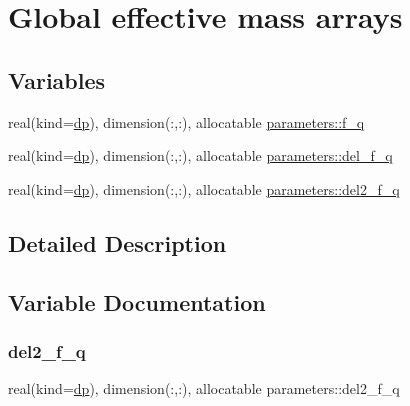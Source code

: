 \hypertarget{group__EFF__MASSES}{}\section{Global effective mass arrays}
\label{group__EFF__MASSES}
\subsection*{Variables}
\begin{DoxyCompactItemize}
\item 
real(kind=\mbox{\hyperlink{namespaceparameters_a52f8c6351fd79345d8811e065bcbbb37}{dp}}), dimension(\+:,\+:), allocatable \mbox{\hyperlink{group__EFF__MASSES_ga5d14e09efe44edd96be9317868828e75}{parameters\+::f\+\_\+q}}
\item 
real(kind=\mbox{\hyperlink{namespaceparameters_a52f8c6351fd79345d8811e065bcbbb37}{dp}}), dimension(\+:,\+:), allocatable \mbox{\hyperlink{group__EFF__MASSES_gadd7fc7f6fdfb5f9f6303c42bfb0eb81c}{parameters\+::del\+\_\+f\+\_\+q}}
\item 
real(kind=\mbox{\hyperlink{namespaceparameters_a52f8c6351fd79345d8811e065bcbbb37}{dp}}), dimension(\+:,\+:), allocatable \mbox{\hyperlink{group__EFF__MASSES_ga0bdacded69f98c713231b1eeaa1a2d05}{parameters\+::del2\+\_\+f\+\_\+q}}
\end{DoxyCompactItemize}


\subsection{Detailed Description}


\subsection{Variable Documentation}
\mbox{\label{group__EFF__MASSES_ga0bdacded69f98c713231b1eeaa1a2d05}} 
\subsubsection{\texorpdfstring{del2\+\_\+f\+\_\+q}{del2\_f\_q}}
{\footnotesize\ttfamily real(kind=\mbox{\hyperlink{namespaceparameters_a52f8c6351fd79345d8811e065bcbbb37}{dp}}), dimension(\+:,\+:), allocatable parameters\+::del2\+\_\+f\+\_\+q}

